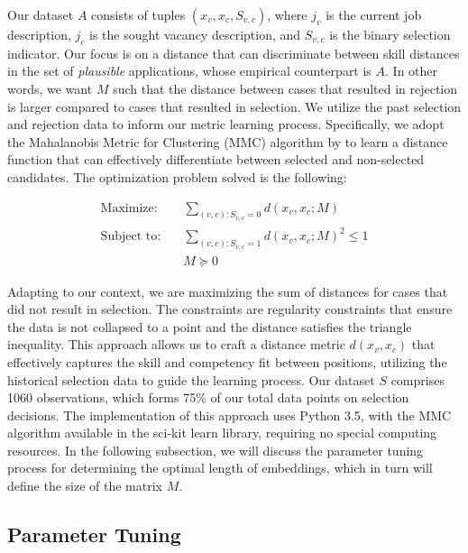 \documentclass[12pt]{article}
\begin{document}
Our dataset \(A\) consists of tuples \((x_v, x_c, S_{v,c})\), where \(j_v\) is the current job description, \(j_c\) is the sought vacancy description, and \(S_{v,c}\) is the binary selection indicator. Our focus is on a distance that can discriminate between skill distances in the set of \textit{plausible} applications, whose empirical counterpart is \(A\). In other words, we want \(M\) such that the distance between cases that resulted in rejection is larger compared to cases that resulted in selection. We utilize the past selection and rejection data to inform our metric learning process. Specifically, we adopt the Mahalanobis Metric for Clustering (MMC) algorithm by \autocite{Xing2002} to learn a distance function that can effectively differentiate between selected and non-selected candidates. The optimization problem solved is the following: 

\begin{align*}
\text{Maximize:} \quad & \sum_{(v,c): S_{v,c} = 0} d(x_v, x_c; M) \\[1em]
\text{Subject to:} \quad & \sum_{(v,c): S_{v,c} = 1} d(x_v, x_c; M)^2 \leq 1 \\
& M \succeq 0
\end{align*}


Adapting to our context, we are maximizing the sum of distances for cases that did not result in selection. The constraints are regularity constraints that ensure the data is not collapsed to a point and the distance satisfies the triangle inequality. This approach allows us to craft a distance metric \(d(x_v, x_c)\) that effectively captures the skill and competency fit between positions, utilizing the historical selection data to guide the learning process. Our dataset \(S\) comprises 1060 observations, which forms 75\% of our total data points on selection decisions. The implementation of this approach uses Python 3.5, with the MMC algorithm available in the sci-kit learn library, requiring no special computing resources. In the following subsection, we will discuss the parameter tuning process for determining the optimal length of embeddings, which in turn will define the size of the matrix \(M\).




\subsection{Parameter Tuning} 
\end{document}
